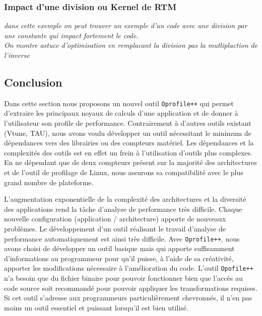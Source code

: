     \subsubsection{Impact d'une division ou Kernel de RTM}
    
    \textit{dans cette exemple on peut trouver un exemple d'un code avec une division par une constante qui impact fortement le code.}\\
    \textit{On montre astuce d'optimisation en remplacant la division pas la mutliplaction de l'inverse}\\
    







\subsection{Conclusion}

    Dans cette section nous proposons un nouvel outil \verb|Oprofile++| qui permet d'extraire les principaux noyaux de calculs d'une application et de donner à l'utilisateur son profile de performance. Contrairement à d'autres outils existant (Vtune, TAU), nous avons voulu développer un outil nécessitant le minimum de dépendances vers des librairies ou des compteurs matériel. Les dépendances et la complexités des outils est en effet un frein à l'utilisation d'outils plus complexes. En ne dépendant que de deux compteurs présent sur la majorité des architectures et de l'outil de profilage de Linux, nous assurons sa compatibilité avec le plus grand nombre de plateforme. 

    L'augmentation exponentielle de la complexité des architectures et la diversité des applications rend la tâche d'analyse de performance très difficile. Chaque nouvelle configuration (application / architecture) apporte de nouveaux problèmes. Le développement d'un outil réalisant le travail d'analyse de performance automatiquement est ainsi très difficile. Avec \verb|Oprofile++|, nous avons choisi de développer un outil basique mais qui apporte suffisamment d'informations au programmeur pour qu'il puisse, à l'aide de sa créativité, apporter les modifications nécessaire à l'amélioration du code. L'outil \verb|Opofile++| n'a besoin que du fichier binaire pour pouvoir fonctionner bien que l'accès au code source soit recommandé pour pouvoir appliquer les transformations requises. Si cet outil s'adresse aux programmeurs particulièrement chevronnés, il n'en pas moins un outil essentiel et puissant lorsqu'il est bien utilisé. 
    
